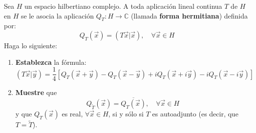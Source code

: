 \documentclass[12pt]{report}
\theoremstyle{largebreak}
\newcommand\cf[3]{\ensuremath{#1:#2\rightarrow#3}}
\newcommand\adj[1]{\ensuremath{\widetilde{#1}}}
\newcommand\pint[2]{\ensuremath{\left(#1\big|#2\right)}}
\newcommand\conj[1]{\ensuremath{\overline{#1}}}
\begin{document}
    \begin{excer}
        Sea $H$ un espacio hilbertiano complejo. A toda aplicación lineal continua $T$ de $H$ en $H$ se le asocia la aplicación $\cf{Q_T}{H}{\mathbb{C}}$ (llamada \textbf{forma hermitiana}) definida por:
        \begin{equation*}
            Q_T(\vec{x})=\pint{T\vec{x}}{\vec{x}},\quad\forall\vec{x}\in H
        \end{equation*}
        Haga lo siguiente:
        \begin{enumerate}
            \item \textbf{Establezca} la fórmula:
            \begin{equation*}
                \pint{T\vec{x}}{\vec{y}}=\frac{1}{4}\left[Q_T(\vec{x}+\vec{y})-Q_T(\vec{x}-\vec{y})+iQ_T(\vec{x}+i\vec{y})-iQ_T(\vec{x}-i\vec{y})\right]
            \end{equation*}
            \item \textbf{Muestre} que
            \begin{equation*}
                Q_{\adj{T}}(\vec{x})=\conj{Q_T(\vec{x})},\quad\forall\vec{x}\in H
            \end{equation*}
            y que $Q_T(\vec{x})$ es real, $\forall\vec{x}\in H$, si y sólo si $T$ es autoadjunto (es decir, que $T=\adj{T}$).
        \end{enumerate}
    \end{excer}
\end{document}
